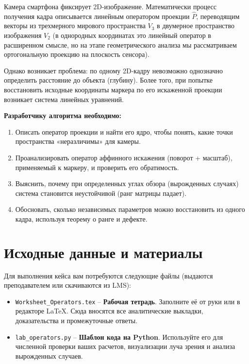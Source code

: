 \documentclass[a4paper,12pt]{article}
\begin{document}
Камера смартфона фиксирует 2D-изображение. Математически процесс получения кадра описывается линейным оператором проекции $\hat{P}$, переводящим векторы из трехмерного мирового пространства $V_3$ в двумерное пространство изображения $V_2$ (в однородных координатах это линейный оператор в расширенном смысле, но на этапе геометрического анализа мы рассматриваем ортогональную проекцию на плоскость сенсора).

Однако возникает проблема: по одному 2D-кадру невозможно однозначно определить расстояние до объекта (глубину). Более того, при попытке восстановить исходные координаты маркера по его искаженной проекции возникает система линейных уравнений.

\medskip
\noindent\textbf{Разработчику алгоритма необходимо:}
\begin{enumerate}[label=\arabic*.]
    \item Описать оператор проекции и найти его ядро, чтобы понять, какие точки пространства «неразличимы» для камеры.
    \item Проанализировать оператор аффинного искажения (поворот + масштаб), применяемый к маркеру, и проверить его обратимость.
    \item Выяснить, почему при определенных углах обзора (вырожденных случаях) система становится неустойчивой (ранг матрицы падает).
    \item Обосновать, сколько независимых параметров можно восстановить из одного кадра, используя теорему о ранге и дефекте.
\end{enumerate}

\section{Исходные данные и материалы}
Для выполнения кейса вам потребуются следующие файлы (выдаются преподавателем или скачиваются из LMS):
\begin{itemize}[label=$\bullet$]
    \item \texttt{Worksheet\_Operators.tex} -- \textbf{Рабочая тетрадь}. Заполните её от руки или в редакторе LaTeX. Сюда вносятся все аналитические выкладки, доказательства и промежуточные ответы.
    \item \texttt{lab\_operators.py} -- \textbf{Шаблон кода на Python}. Используйте его для численной проверки ваших расчетов, визуализации луча зрения и анализа вырожденных случаев.
\end{itemize}
\end{document}

